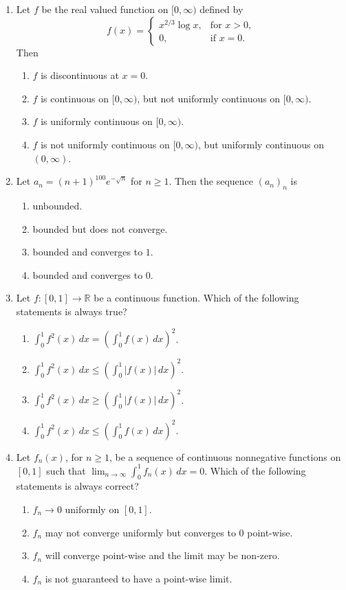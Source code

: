 \documentclass[11pt, a4paper]{article}
\begin{document}
\begin{enumerate}
  \item Let $f$ be the real valued function on $[0, \infty)$ defined by
  \[
    f(x) = \begin{cases} x^{2/3} \log x, & \text{for } x > 0, \\ 0, & \text{if } x = 0. \end{cases}
  \]
  Then
  \begin{enumerate}[label=\Alph*.]
    \item $f$ is discontinuous at $x = 0$.
    \item $f$ is continuous on $[0, \infty)$, but not uniformly continuous on $[0, \infty)$.
    \item $f$ is uniformly continuous on $[0, \infty)$.
    \item $f$ is not uniformly continuous on $[0, \infty)$, but uniformly continuous on $(0, \infty)$.
  \end{enumerate}

  \item Let $a_n = (n + 1)^{100} e^{-\sqrt{n}}$ for $n \ge 1$. Then the sequence $(a_n)_n$ is
  \begin{enumerate}[label=\Alph*.]
    \item unbounded.
    \item bounded but does not converge.
    \item bounded and converges to $1$.
    \item bounded and converges to $0$.
  \end{enumerate}

  \item Let $f: [0, 1] \to \mathbb{R}$ be a continuous function. Which of the following statements is always true?
  \begin{enumerate}[label=\Alph*.]
    \item $\int_0^1 f^2(x)\,dx = \left(\int_0^1 f(x)\,dx\right)^2$.
    \item $\int_0^1 f^2(x)\,dx \le \left(\int_0^1 |f(x)|\,dx\right)^2$.
    \item $\int_0^1 f^2(x)\,dx \ge \left(\int_0^1 |f(x)|\,dx\right)^2$.
    \item $\int_0^1 f^2(x)\,dx \le \left(\int_0^1 f(x)\,dx\right)^2$.
  \end{enumerate}

  \item Let $f_n(x)$, for $n \ge 1$, be a sequence of continuous nonnegative functions on $[0, 1]$ such that $\lim_{n \to \infty} \int_0^1 f_n(x)\,dx = 0$. Which of the following statements is always correct?
  \begin{enumerate}[label=\Alph*.]
    \item $f_n \to 0$ uniformly on $[0, 1]$.
    \item $f_n$ may not converge uniformly but converges to $0$ point-wise.
    \item $f_n$ will converge point-wise and the limit may be non-zero.
    \item $f_n$ is not guaranteed to have a point-wise limit.
  \end{enumerate}


\end{enumerate}
\end{document}
